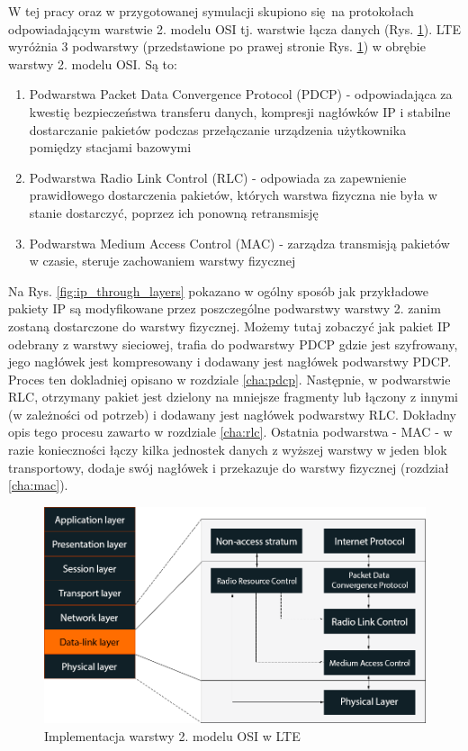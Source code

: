W tej pracy oraz w przygotowanej symulacji skupiono się na protokołach odpowiadającym warstwie 2. modelu OSI tj. warstwie łącza danych (Rys. \ref{fig:osi_to_lte}). LTE wyróżnia 3 podwarstwy (przedstawione po prawej stronie Rys. \ref{fig:osi_to_lte}) w obrębie warstwy 2. modelu OSI. Są to:

\begin{enumerate}
	\item Podwarstwa Packet Data Convergence Protocol (PDCP) - odpowiadająca za kwestię bezpieczeństwa transferu danych, kompresji nagłówków IP i stabilne dostarczanie pakietów podczas przełączanie urządzenia użytkownika pomiędzy stacjami bazowymi
	\item Podwarstwa Radio Link Control (RLC) - odpowiada za zapewnienie prawidłowego dostarczenia pakietów, których warstwa fizyczna nie była w stanie dostarczyć, poprzez ich ponowną retransmisję
	\item Podwarstwa Medium Access Control (MAC) - zarządza transmisją pakietów w czasie, steruje zachowaniem warstwy fizycznej
\end{enumerate}

Na Rys. \ref{fig:ip_through_layers} pokazano w ogólny sposób jak przykładowe pakiety IP są modyfikowane przez poszczególne podwarstwy warstwy 2. zanim zostaną dostarczone do warstwy fizycznej. Możemy tutaj zobaczyć jak pakiet IP odebrany z warstwy sieciowej, trafia do podwarstwy PDCP gdzie jest szyfrowany, jego nagłówek jest kompresowany i dodawany jest nagłówek podwarstwy PDCP. Proces ten dokladniej opisano w rozdziale \ref{cha:pdcp}. Następnie, w podwarstwie RLC, otrzymany pakiet jest dzielony na mniejsze fragmenty lub łączony z innymi (w zależności od potrzeb) i dodawany jest nagłówek podwarstwy RLC. Dokładny opis tego procesu zawarto w rozdziale \ref{cha:rlc}. Ostatnia podwarstwa - MAC - w razie konieczności łączy kilka jednostek danych z wyższej warstwy w jeden blok transportowy, dodaje swój nagłówek i przekazuje do warstwy fizycznej (rozdział \ref{cha:mac}).

\begin{figure}
	\centerline{\includegraphics[width=1.0\textwidth]{images/osi_to_lte.png}}
	\caption{Implementacja warstwy 2. modelu OSI w LTE}
	\label{fig:osi_to_lte}
\end{figure}

